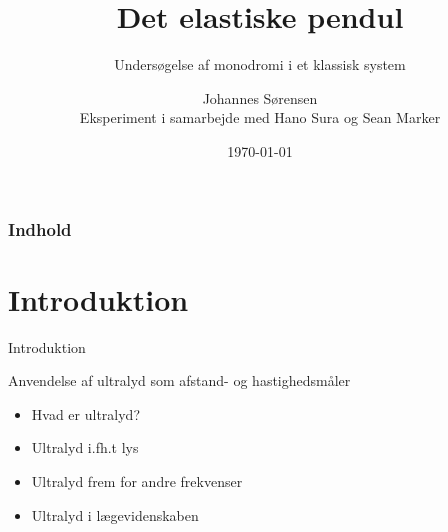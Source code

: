 \documentclass[usenames,english]{beamer} %
\title{Det elastiske pendul}
\subtitle{Undersøgelse af monodromi i et klassisk system}
\author[Johannes Sørensen]{Johannes Sørensen\\[3mm] \tiny{Eksperiment i samarbejde med Hano Sura og Sean Marker}}
\institute[Niels Bohr Institutet]{Niels Bohr Institutet}
\date[]{\today}
\begin{document}
	
	
	\frame[plain]{\titlepage} %
	
	\begin{frame}
	\frametitle{Indhold} %
	\tableofcontents
\end{frame}

\section{Introduktion} %
\begin{frame}{Introduktion}
\begin{block}{Anvendelse af ultralyd som afstand- og hastighedsmåler}
	\begin{itemize}
		\item Hvad er ultralyd?
		\item Ultralyd i.fh.t lys
		\item Ultralyd frem for andre frekvenser
		\item Ultralyd i lægevidenskaben
	\end{itemize}
\end{block}
\end{frame}
\end{document}
